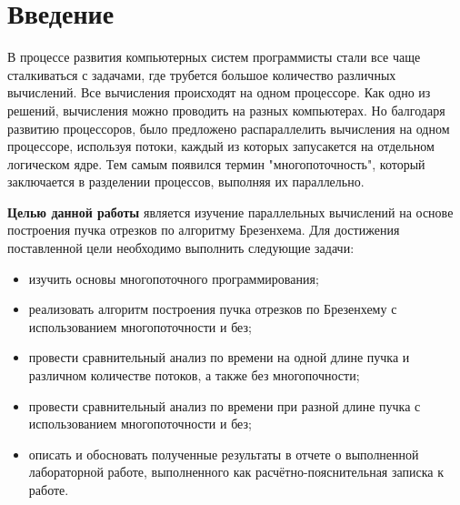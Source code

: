 \chapter*{Введение}


В процессе развития компьютерных систем программисты стали все чаще сталкиваться с задачами, где трубется большое количество различных вычислений. Все вычисления происходят на одном процессоре. Как одно из решений, вычисления можно проводить на разных компьютерах. Но балгодаря развитию процессоров, было предложено распараллелить вычисления на одном процессоре, используя потоки, каждый из которых запусакется на отдельном логическом ядре. Тем самым появился термин "многопоточность", который заключается в разделении процессов, выполняя их параллельно. \newline


\textbf{Целью данной работы} является изучение параллельных вычислений на основе построения пучка отрезков по алгоритму Брезенхема. 
Для достижения поставленной цели необходимо выполнить следующие задачи:
\begin{itemize}
	\item изучить основы многопоточного программирования;
    \item реализовать алгоритм построения пучка отрезков по Брезенхему с использованием многопоточности и без;
    \item провести сравнительный анализ по времени на одной длине пучка и различном количестве потоков, а также без многопочности;
    \item провести сравнительный анализ по времени при разной длине пучка с использованием многопоточности и без;
	\item описать и обосновать полученные результаты в отчете о выполненной лабораторной работе, выполненного как расчётно-пояснительная записка к работе.
\end{itemize}
